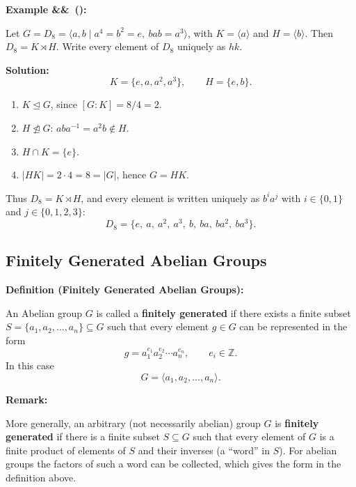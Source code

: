 \documentclass[11pt,a4paper]{article}
\newcommand{\Z}{\mathbb{Z}}
\newenvironment{definition}[1]{
	\begin{definitionbox}
		\textbf{\color{primaryColor}Definition (#1):} 
	}{
	\end{definitionbox}
}
\newcounter{examplecnt}[section]
\newenvironment{example}[1][]{
	\stepcounter{examplecnt}
	\begin{examplebox}
		\textbf{\color{exampleColor}Example \arabic{examplecnt}\ifx&#1&\else\ (#1)\fi:} 
	}{
	\end{examplebox}
}
\newenvironment{remark}{
	\begin{remarkbox}
		\textbf{\color{remarkColor}Remark:} 
	}{
	\end{remarkbox}
}
\begin{document}
	\begin{example}
		Let $G = D_8 = \langle a, b \mid a^4 = b^2 = e,\ bab = a^3 \rangle$, with $K = \langle a \rangle$ and $H = \langle b \rangle$. Then $D_8 = K \rtimes H$. Write every element of $D_8$ uniquely as $hk$.
		
		\vspace{0.5em}
		\noindent \textbf{Solution:}
		\[
		K = \{e, a, a^2, a^3\}, \qquad H = \{e, b\}.
		\]
		\begin{enumerate}
			\item $K \trianglelefteq G$, since $[G : K] = 8/4 = 2$.
			\item $H \ntrianglelefteq G$: $a b a^{-1} = a^2 b \notin H$.
			\item $H \cap K = \{e\}$.
			\item $|HK| = 2 \cdot 4 = 8 = |G|$, hence $G = HK$.
		\end{enumerate}
		Thus $D_8 = K \rtimes H$, and every element is written uniquely as $b^i a^j$ with $i \in \{0, 1\}$ and $j \in \{0, 1, 2, 3\}$:
		\[
		D_8 = \{e,\ a,\ a^2,\ a^3,\ b,\ ba,\ ba^2,\ ba^3\}.
		\]
	\end{example}
	
	
	\subsection{Finitely Generated Abelian Groups}
	
	\begin{definition}{Finitely Generated Abelian Groups}
		An Abelian group $G$ is called a \textbf{finitely generated} if there exists a finite subset $S = \{a_1, a_2, \dots, a_n\} \subseteq G$ such that every element $g \in G$ can be represented in the form
		\[
		g = a_1^{e_1} a_2^{e_2} \cdots a_n^{e_n}, \qquad e_i \in \Z.
		\]
		In this case
		\[
		G = \langle a_1, a_2, \dots, a_n \rangle.
		\]
	\end{definition}
	
	\begin{remark}
		More generally, an arbitrary (not necessarily abelian) group $G$ is \textbf{finitely generated} if there is a finite subset $S \subseteq G$ such that every element of $G$ is a finite product of elements of $S$ and their inverses (a ``word'' in $S$). For abelian groups the factors of such a word can be collected, which gives the form in the definition above.
	\end{remark}
	
\end{document}
